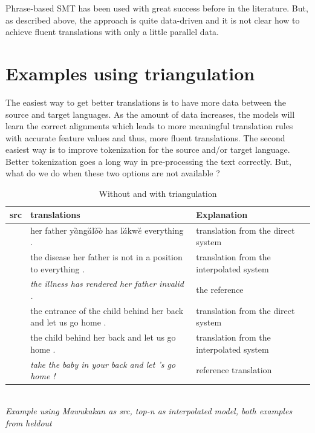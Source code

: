 Phrase-based SMT has been used with great success before in the literature. But, as described above, the approach is quite data-driven and it is not clear how to achieve fluent translations with only a little parallel data.  

\section{Examples using triangulation}

The easiest way to get better translations is to have more data between the source and target languages. As the amount of data increases, the models will learn the correct alignments which leads to more meaningful translation rules with accurate feature values and thus, more fluent translations. The second easiest way is to improve tokenization for the source and/or target language. Better tokenization goes a long way in pre-processing the text correctly. But, what do we do when these two options are not available ? 

\newcommand{\mawuexample}[1]{\emph{$y\grave{a}ng\acute{a}l\acute{a}\grave{a}$ w$\acute{\varepsilon}\acute{\varepsilon}$ $\grave{a}$ $\grave{a}$ l$\acute{a}$kw$\acute{e}$ k$\acute{o}\acute{o}$ b$\acute{\varepsilon}$ m$\grave{a}$ .}}

\newcommand{\anothermawu}[1]{\emph{\textipa{\!d}y$\grave{e}$n\textipa{\textltailn}$\acute{o}$ l$\grave{a}$ $\acute{i}$ kw$\acute{ɔ}$l$\grave{ɔ}$ $\acute{à}n$ d$\grave{a}$$\grave{a}$ l$\grave{u}$ m$\grave{a}$ }}

\begin{table}
	\caption{Without and with triangulation}
	\footnotesize
	\small
	\begin{tabular}{p{}p{}p{}}
	\toprule
	src & translations & Explanation \\
	\toprule
	\multirow{3}{*}{\mawuexample} 
	& her father y$\grave{a}$̀ng$\acute{a}$́l$\acute{o}$́$\grave{o}$̀ has l$\grave{a}$́kw$\grave{e}$́ everything . & translation from the direct system 
	\\ \cmidrule(r){2-3}
	&  the disease her father is not in a position to everything . & translation from the interpolated system 
	\\ \cmidrule(r){2-3}
	&  \emph{the illness has rendered her father invalid .}  & the reference 
	\\  
	\midrule
	\midrule
	\multirow{3}{*}{\anothermawu} 
	&  the entrance of the child behind her back and let us go home . & translation from the direct system \\
	\cmidrule(r){2-3}
	&  the child behind her back and let us go home . & translation from the interpolated system \\
	\cmidrule(r){2-3}
	& \emph{take the baby in your back and let 's go home !} & reference translation \\
	\bottomrule
	\end{tabular}
	\\[3.5pt]
	{\centering \emph{Example using Mawukakan as src, top-\emph{n} as interpolated model, both examples from heldout}}
	\label{table:mawu_improvement}
\end{table}


